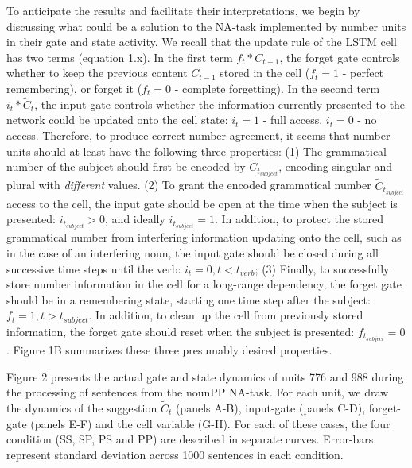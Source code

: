 To anticipate the results and facilitate their interpretations, we begin by discussing what could be a solution to the NA-task implemented by number units in their gate and state activity. We recall that the update rule of the LSTM cell has two terms (equation 1.x). In the first term $f_t * C_{t-1}$, the forget gate controls whether to keep the previous content $C_{t-1}$ stored in the cell ($f_t=1$ - perfect remembering), or forget it ($f_t=0$ - complete forgetting). In the second term $i_t*\tilde{C}_t$, the input gate controls whether the information currently presented to the network could be updated onto the cell state: $i_t=1$ - full access, $i_t=0$ - no access. Therefore, to produce correct number agreement, it seems that number units should at least have the following three properties: (1) The grammatical number of the subject should first be encoded by $\tilde{C}_{t_{subject}}$, encoding singular and plural with \textit{different} values. (2) To grant the encoded grammatical number $\tilde{C}_{t_{subject}}$ access to the cell, the input gate should be open at the time when the subject is presented: $i_{t_{subject}}>0$, and ideally $i_{t_{subject}}=1$. In addition, to protect the stored grammatical number from interfering information updating onto the cell, such as in the case of an interfering noun, the input gate should be closed during all successive time steps until the verb: $i_t=0, t<t_{verb}$; (3) Finally, to successfully store number information in the cell for a long-range dependency, the forget gate should be in a remembering state, starting one time step after the subject: $f_t=1, t>t_{subject}$. In addition, to clean up the cell from previously stored information, the forget gate should reset when the subject is presented: $f_{t_{subject}}=0$. Figure 1B summarizes these three presumably desired properties.

Figure 2 presents the actual gate and state dynamics of units 776 and 988 during the processing of sentences from the nounPP NA-task. For each unit, we draw the dynamics of the suggestion $\tilde{C}_t$ (panels A-B), input-gate (panels C-D), forget-gate (panels E-F) and the cell variable (G-H). For each of these cases, the four condition (SS, SP, PS and PP) are described in separate curves. Error-bars represent standard deviation across 1000 sentences in each condition.

